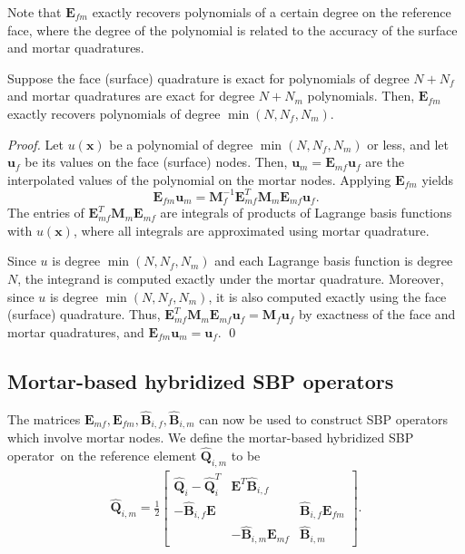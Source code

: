 \documentclass{svjour3}                     %
\renewcommand{\hat}{\widehat}
\newcommand{\LRp}[1]{\left( #1 \right)}
\begin{document}

Note that $\bm{E}_{fm}$ exactly recovers polynomials of a certain degree on the reference face, where the degree of the polynomial is related to the accuracy of the surface and mortar quadratures.
\begin{lemma}
\label{lemma:Efm}
Suppose the face (surface) quadrature is exact for polynomials of degree $N+N_f$ and mortar quadratures are exact for degree $N+N_m$ polynomials.  Then, $\bm{E}_{fm}$ exactly recovers polynomials of degree $\min(N,N_f,N_m)$.
\end{lemma}
\begin{proof}
Let $u(\bm{x})$ be a polynomial of degree $\min(N,N_f,N_m)$ or less, and let $\bm{u}_f$ be its values on the face (surface) nodes.  Then, $\bm{u}_m = \bm{E}_{mf}\bm{u}_f$ are the interpolated values of the polynomial on the mortar nodes.  Applying $\bm{E}_{fm}$ yields
\[
\bm{E}_{fm}\bm{u}_m = \bm{M}_f^{-1}\bm{E}_{mf}^T\bm{M}_m\bm{E}_{mf}\bm{u}_f.
\]
The entries of $\bm{E}_{mf}^T\bm{M}_m\bm{E}_{mf}$ are integrals of products of Lagrange basis functions with $u(\bm{x})$, where all integrals are approximated using mortar quadrature.  

Since $u$ is degree $\min(N,N_f,N_m)$ and each Lagrange basis function is degree $N$, the integrand is computed exactly under the mortar quadrature.  Moreover, since $u$ is degree $\min(N,N_f,N_m)$, it is also computed exactly using the face (surface) quadrature.  Thus, $\bm{E}_{mf}^T\bm{M}_m\bm{E}_{mf} \bm{u}_f = \bm{M}_f \bm{u}_f$ by exactness of the face and mortar quadratures, and $\bm{E}_{fm}\bm{u}_m = \bm{u}_f$.
\qed\end{proof}

\subsection{Mortar-based hybridized SBP operators}

The matrices $\bm{E}_{mf}, \bm{E}_{fm}, \hat{\bm{B}}_{i,f}, \hat{\bm{B}}_{i,m}$ can now be used to construct SBP operators which involve mortar nodes.  We define the mortar-based hybridized SBP operator on the reference element $\hat{\bm{Q}}_{i,m}$ to be
\begin{align}
\hat{\bm{Q}}_{i,m} = \frac{1}{2}\begin{bmatrix}
\hat{\bm{Q}}_i - \hat{\bm{Q}}_i^T & \bm{E}^T\hat{\bm{B}}_{i,f} & \\
-\hat{\bm{B}}_{i,f}\bm{E} & & \hat{\bm{B}}_{i,f} \bm{E}_{fm}\\
& -\hat{\bm{B}}_{i,m} \bm{E}_{mf} & \hat{\bm{B}}_{i,m}
\end{bmatrix}.
\label{eq:mhsbp}
\end{align}
\end{document}
